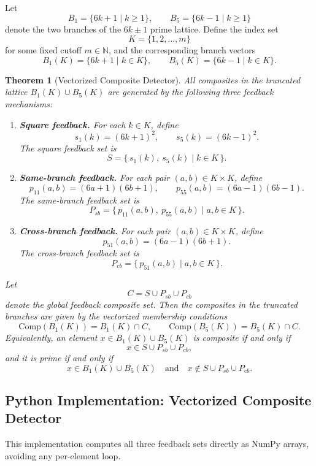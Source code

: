 \documentclass[12pt]{article}
\newtheorem{theorem}{Theorem}
\begin{document}
Let
\[
B_1 = \{6k+1 \mid k \geq 1\}, \qquad B_5 = \{6k-1 \mid k \geq 1\}
\]
denote the two branches of the $6k\pm1$ prime lattice. Define the index set
\[
K = \{1, 2, \ldots, m\}
\]
for some fixed cutoff $m \in \mathbb{N}$, and the corresponding branch
vectors
\[
B_1(K) = \{6k+1 \mid k \in K\}, \qquad B_5(K) = \{6k-1 \mid k \in K\}.
\]

\begin{theorem}[Vectorized Composite Detector]
All composites in the truncated lattice $B_1(K) \cup B_5(K)$ are generated by
the following three feedback mechanisms:

\begin{enumerate}
\item \textbf{Square feedback.}
For each $k \in K$, define
\[
s_1(k) = (6k+1)^2, \qquad s_5(k) = (6k-1)^2.
\]
The square feedback set is
\[
S = \{\, s_1(k),\ s_5(k) \mid k \in K \,\}.
\]

\item \textbf{Same-branch feedback.}
For each pair $(a,b) \in K \times K$, define
\[
p_{11}(a,b) = (6a+1)(6b+1), \qquad p_{55}(a,b) = (6a-1)(6b-1).
\]
The same-branch feedback set is
\[
P_{sb} = \{\, p_{11}(a,b),\ p_{55}(a,b) \mid a,b \in K \,\}.
\]

\item \textbf{Cross-branch feedback.}
For each pair $(a,b) \in K \times K$, define
\[
p_{51}(a,b) = (6a-1)(6b+1).
\]
The cross-branch feedback set is
\[
P_{cb} = \{\, p_{51}(a,b) \mid a,b \in K \,\}.
\]
\end{enumerate}

Let
\[
C = S \cup P_{sb} \cup P_{cb}
\]
denote the global feedback composite set. Then the composites in the
truncated branches are given by the vectorized membership conditions
\[
\mathrm{Comp}(B_1(K)) = B_1(K) \cap C, \qquad
\mathrm{Comp}(B_5(K)) = B_5(K) \cap C.
\]
Equivalently, an element $x \in B_1(K) \cup B_5(K)$ is composite if and only
if
\[
x \in S \cup P_{sb} \cup P_{cb},
\]
and it is prime if and only if
\[
x \in B_1(K) \cup B_5(K) \quad \text{and} \quad x \notin S \cup P_{sb} \cup P_{cb}.
\]
\end{theorem}

\subsection*{Python Implementation: Vectorized Composite Detector}
This implementation computes all three feedback sets directly as NumPy
arrays, avoiding any per-element loop.
\end{document}
